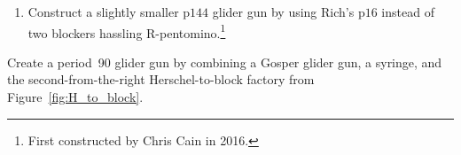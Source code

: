\begin{multicols}{2}
\begin{problem}
\begin{enumerate}[label=\bf\color{ocre}(\alph*)]
			\item Construct a slightly smaller p$144$ glider gun by using Rich's p$16$ instead of two blockers hassling R-pentomino.\footnote{First constructed by Chris Cain in 2016.}
		\end{enumerate}
	\end{problem}
	
	
	
	
	
	\mfilbreak
	
	
	\begin{problem}\label{exer:block_factory_is_tripler} 
		Create a period~90 glider gun by combining a Gosper glider gun, a syringe, and the second-from-the-right Herschel-to-block factory from Figure~\ref{fig:H_to_block}.
	\end{problem}
	

\end{multicols}
